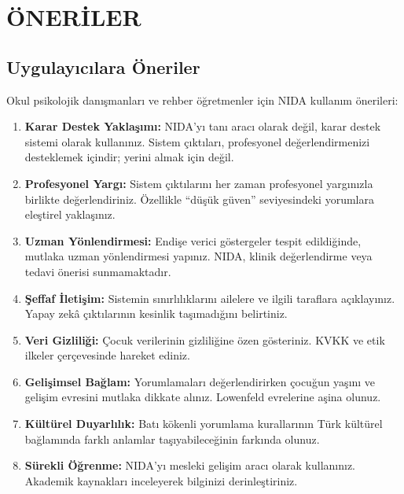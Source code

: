
\chapter{ÖNERİLER}

\section{Uygulayıcılara Öneriler}

Okul psikolojik danışmanları ve rehber öğretmenler için NIDA kullanım önerileri:

\begin{enumerate}
  \item \textbf{Karar Destek Yaklaşımı:} NIDA'yı tanı aracı olarak değil, karar destek sistemi olarak kullanınız. Sistem çıktıları, profesyonel değerlendirmenizi desteklemek içindir; yerini almak için değil.

  \item \textbf{Profesyonel Yargı:} Sistem çıktılarını her zaman profesyonel yargınızla birlikte değerlendiriniz. Özellikle ``düşük güven'' seviyesindeki yorumlara eleştirel yaklaşınız.

  \item \textbf{Uzman Yönlendirmesi:} Endişe verici göstergeler tespit edildiğinde, mutlaka uzman yönlendirmesi yapınız. NIDA, klinik değerlendirme veya tedavi önerisi sunmamaktadır.

  \item \textbf{Şeffaf İletişim:} Sistemin sınırlılıklarını ailelere ve ilgili taraflara açıklayınız. Yapay zekâ çıktılarının kesinlik taşımadığını belirtiniz.

  \item \textbf{Veri Gizliliği:} Çocuk verilerinin gizliliğine özen gösteriniz. KVKK ve etik ilkeler çerçevesinde hareket ediniz.

  \item \textbf{Gelişimsel Bağlam:} Yorumlamaları değerlendirirken çocuğun yaşını ve gelişim evresini mutlaka dikkate alınız. Lowenfeld evrelerine aşina olunuz.

  \item \textbf{Kültürel Duyarlılık:} Batı kökenli yorumlama kurallarının Türk kültürel bağlamında farklı anlamlar taşıyabileceğinin farkında olunuz.

  \item \textbf{Sürekli Öğrenme:} NIDA'yı mesleki gelişim aracı olarak kullanınız. Akademik kaynakları inceleyerek bilginizi derinleştiriniz.
\end{enumerate}


